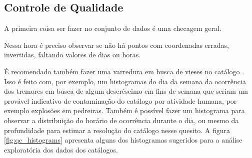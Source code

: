 \subsection{Controle de Qualidade}
\label{sec:qualicontrol}

A primeira coisa ser fazer no conjunto de dados é uma checagem geral.

Nessa hora é preciso observar se não há pontos com coordenadas erradas, invertidas, faltando valores de dias ou horas.

É recomendado também fazer uma varredura em busca de vieses no catálogo \citep{van_stiphout_2010}.
Isso é feito com, por exemplo, um histogramas do dia da semana da ocorrência dos tremores em busca
de algum descréscimo em fins de semana que seriam um provável indicativo de contaminação do catálogo 
por atividade humana, por exemplo explosões em pedreiras. 
Também é possível fazer um histograma para observar a
distribuição do horário de ocorrência durante o dia, 
ou mesmo da profundidade para estimar a resolução do catálogo
nesse quesito. A figura \ref{fig:qc_histograms} apresenta alguns dos histogramas sugeridos para a análise
exploratória dos dados dos catálogos.

